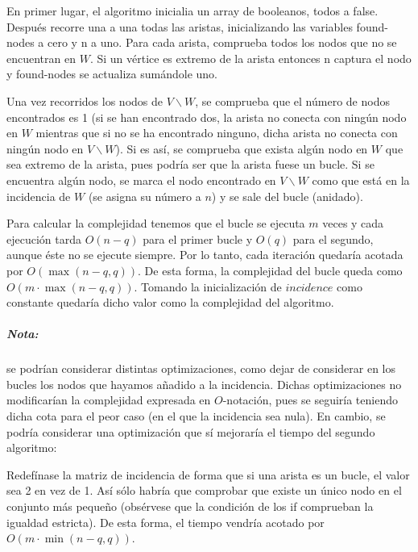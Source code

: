 \documentclass[12pt, oneside, a4paper]{article}
\begin{document}
En primer lugar, el algoritmo inicialia un array de booleanos, todos a
false. Después recorre una a una todas las aristas, inicializando las
variables found-nodes a cero y n a uno. Para cada arista, comprueba todos
los nodos que no se encuentran en $W$. Si un vértice es extremo de la
arista entonces n captura el nodo y found-nodes se actualiza sumándole
uno.

Una vez recorridos los nodos de $V\backslash W$, se comprueba que el
número de nodos encontrados es 1 (si se han encontrado dos, la arista
no conecta con ningún nodo en $W$ mientras que si no se ha encontrado
ninguno, dicha arista no conecta con ningún nodo en $V\backslash
W$). Si es así, se comprueba que exista algún nodo en $W$ que sea
extremo de la arista, pues podría ser que la arista fuese un bucle. Si
se encuentra algún nodo, se marca el nodo encontrado en $V\backslash
W$ como que está en la incidencia de $W$ (se asigna su número a $n$) y
se sale del bucle (anidado).

Para calcular la complejidad tenemos que el bucle se ejecuta $m$ veces
y cada ejecución tarda $O(n-q)$ para el primer bucle y $O(q)$ para el
segundo, aunque éste no se ejecute siempre. Por lo tanto, cada
iteración quedaría acotada por $O(\max(n-q, q))$. De esta forma, la
complejidad del bucle queda como $O(m\cdot\max(n-q,q))$. Tomando la
inicialización de $incidence$ como constante quedaría dicho valor como
la complejidad del algoritmo.

\subparagraph{Nota:} se podrían considerar distintas optimizaciones,
como dejar de considerar en los bucles los nodos que hayamos añadido a
la incidencia. Dichas optimizaciones no modificarían la complejidad
expresada en $O$-notación, pues se seguiría teniendo dicha cota para
el peor caso (en el que la incidencia sea nula). En cambio, se podría
considerar una optimización que sí mejoraría el tiempo del segundo
algoritmo:

Redefínase la matriz de incidencia de forma que si una arista es un
bucle, el valor sea 2 en vez de 1. Así sólo habría que comprobar que
existe un único nodo en el conjunto más pequeño (obsérvese que la
condición de los if comprueban la igualdad estricta). De esta forma,
el tiempo vendría acotado por $O(m\cdot\min(n-q,q))$.
\end{document}
